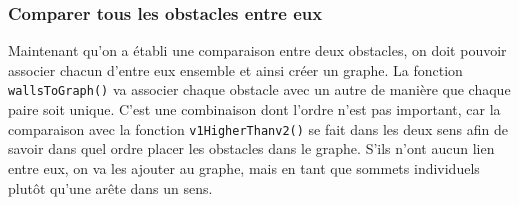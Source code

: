 \documentclass[11pt,french,a4paper,]{article}
\begin{document}
\hypertarget{comparer-tous-les-obstacles-entre-eux}{%
\subsubsection{Comparer tous les obstacles entre
eux}\label{comparer-tous-les-obstacles-entre-eux}}

Maintenant qu'on a établi une comparaison entre deux obstacles, on doit
pouvoir associer chacun d'entre eux ensemble et ainsi créer un graphe.
La fonction \texttt{wallsToGraph()} va associer chaque obstacle avec un
autre de manière que chaque paire soit unique. C'est une combinaison
dont l'ordre n'est pas important, car la comparaison avec la fonction
\texttt{v1HigherThanv2()} se fait dans les deux sens afin de savoir dans
quel ordre placer les obstacles dans le graphe. S'ils n'ont aucun lien
entre eux, on va les ajouter au graphe, mais en tant que sommets
individuels plutôt qu'une arête dans un sens.
\end{document}
